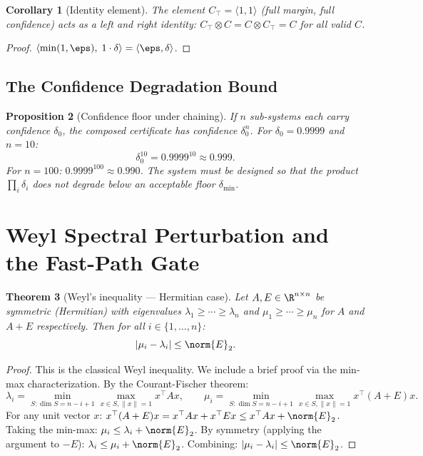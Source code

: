 \documentclass[11pt,letterpaper]{article}
\newtheorem{theorem}{Theorem}[section]
\newtheorem{corollary}[theorem]{Corollary}
\newtheorem{proposition}[theorem]{Proposition}
\theoremstyle{remark}
\begin{document}
\begin{corollary}[Identity element]
The element $C_\top = \langle 1, 1 \rangle$ (full margin, full confidence)
acts as a left and right identity:
$C_\top \otimes C = C \otimes C_\top = C$ for all valid $C$.
\end{corollary}

\begin{proof}
$\langle\min(1,\eps),\; 1 \cdot \delta\rangle = \langle\eps,\delta\rangle$.
\end{proof}

\subsection{The Confidence Degradation Bound}

\begin{proposition}[Confidence floor under chaining]
\label{prop:conf-floor}
If $n$ sub-systems each carry confidence $\delta_0$, the composed
certificate has confidence $\delta_0^n$. For $\delta_0 = 0.9999$ and
$n = 10$:
\[
  \delta_0^{10} = 0.9999^{10} \approx 0.999.
\]
For $n = 100$: $0.9999^{100} \approx 0.990$.
The system must be designed so that the product $\prod_i \delta_i$
does not degrade below an acceptable floor $\delta_{\min}$.
\end{proposition}

\section{Weyl Spectral Perturbation and the Fast-Path Gate}
\label{sec:weyl}

\begin{theorem}[Weyl's inequality --- Hermitian case]
\label{thm:A-weyl-hermitian}
Let $A, E \in \R^{n \times n}$ be symmetric (Hermitian) with
eigenvalues $\lambda_1 \geq \cdots \geq \lambda_n$ and
$\mu_1 \geq \cdots \geq \mu_n$ for $A$ and $A + E$ respectively.
Then for all $i \in \{1,\ldots,n\}$:
\[
  |\mu_i - \lambda_i| \leq \norm{E}_2.
\]
\end{theorem}

\begin{proof}
This is the classical Weyl inequality. We include a brief proof via
the min-max characterization. By the Courant-Fischer theorem:
\[
  \lambda_i = \min_{S: \dim S = n-i+1} \max_{x \in S, \|x\|=1} x^\top A x,
  \qquad
  \mu_i = \min_{S: \dim S = n-i+1} \max_{x \in S, \|x\|=1} x^\top (A+E) x.
\]
For any unit vector $x$:
$x^\top(A+E)x = x^\top A x + x^\top E x \leq x^\top A x + \norm{E}_2$.
Taking the min-max:
$\mu_i \leq \lambda_i + \norm{E}_2$.
By symmetry (applying the argument to $-E$):
$\lambda_i \leq \mu_i + \norm{E}_2$.
Combining: $|\mu_i - \lambda_i| \leq \norm{E}_2$.
\end{proof}
\end{document}
